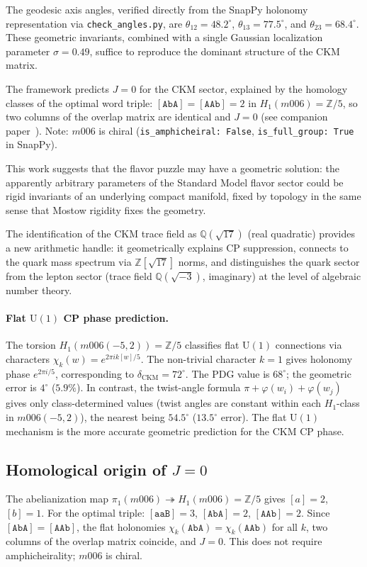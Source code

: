 \documentclass[11pt,a4paper]{article}
\begin{document}
The geodesic axis angles, verified directly from the SnapPy holonomy
representation via \texttt{check\_angles.py}, are
$\theta_{12} = 48.2^\circ$, $\theta_{13} = 77.5^\circ$,
and $\theta_{23} = 68.4^\circ$. These geometric invariants, combined
with a single Gaussian localization parameter $\sigma = 0.49$,
suffice to reproduce the dominant structure of the CKM matrix.

The framework predicts $J = 0$ for the CKM sector, explained by the homology classes of the optimal word triple: $[\texttt{AbA}] = [\texttt{AAb}] = 2$ in $H_1(m006)=\mathbb{Z}/5$, so two columns of the overlap matrix are identical and $J=0$ (see companion paper~\cite{Gentry:CP}). Note: $m006$ is chiral (\texttt{is\_amphicheiral: False}, \texttt{is\_full\_group: True} in SnapPy).

This work suggests that the flavor puzzle may have a geometric
solution: the apparently arbitrary parameters of the Standard Model
flavor sector could be rigid invariants of an underlying compact
manifold, fixed by topology in the same sense that Mostow rigidity
fixes the geometry.

The identification of the CKM trace field as $\mathbb{Q}(\sqrt{17})$
(real quadratic) provides a new arithmetic handle: it geometrically
explains CP suppression, connects to the quark mass spectrum via
$\mathbb{Z}[\sqrt{17}]$ norms, and distinguishes the quark sector
from the lepton sector (trace field $\mathbb{Q}(\sqrt{-3})$,
imaginary) at the level of algebraic number theory.

\paragraph{Flat $\mathrm{U}(1)$ CP phase prediction.}
The torsion $H_1(m006(-5,2)) = \mathbb{Z}/5$ classifies flat
$\mathrm{U}(1)$ connections via characters $\chi_k(w) = e^{2\pi i k[w]/5}$.
The non-trivial character $k=1$ gives holonomy phase $e^{2\pi i/5}$,
corresponding to $\delta_{\mathrm{CKM}} = 72^\circ$.
The PDG value is $68^\circ$; the geometric error is $4^\circ$ ($5.9\%$).
In contrast, the twist-angle formula $\pi + \varphi(w_i) + \varphi(w_j)$
gives only class-determined values (twist angles are constant within
each $H_1$-class in $m006(-5,2)$), the nearest being $54.5^\circ$
($13.5^\circ$ error). The flat $\mathrm{U}(1)$ mechanism is the
more accurate geometric prediction for the CKM CP phase.

\subsection*{Homological origin of $J=0$}
\label{subsec:hom_cp}
The abelianization map $\pi_1(m006)\twoheadrightarrow H_1(m006)=\mathbb{Z}/5$
gives $[a]=2$, $[b]=1$. For the optimal triple:
$[\texttt{aaB}]=3$, $[\texttt{AbA}]=2$, $[\texttt{AAb}]=2$.
Since $[\texttt{AbA}]=[\texttt{AAb}]$, the flat holonomies
$\chi_k(\texttt{AbA})=\chi_k(\texttt{AAb})$ for all $k$,
two columns of the overlap matrix coincide, and $J=0$.
This does not require amphicheirality; $m006$ is chiral.
\end{document}
